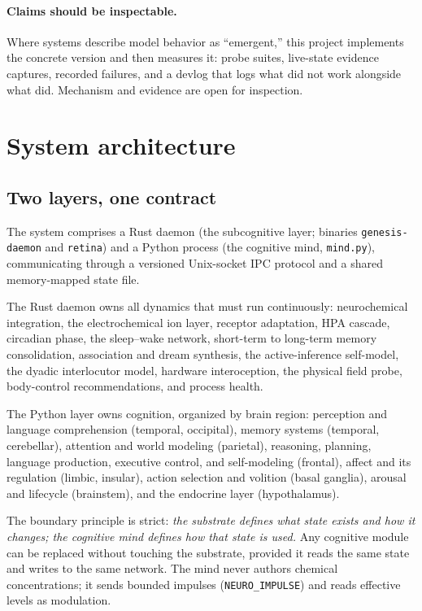 \documentclass[11pt]{article}
\newcommand{\code}[1]{\texttt{\small #1}}
\begin{document}
\paragraph{Claims should be inspectable.} Where systems describe model
behavior as ``emergent,'' this project implements the concrete version
and then measures it: probe suites, live-state evidence captures,
recorded failures, and a devlog that logs what did not work alongside
what did. Mechanism and evidence are open for inspection.

\section{System architecture}

\subsection{Two layers, one contract}

The system comprises a Rust daemon (the subcognitive layer; binaries
\code{genesis-daemon} and \code{retina}) and a Python process (the
cognitive mind, \code{mind.py}), communicating through a versioned
Unix-socket IPC protocol and a shared memory-mapped state file.

The Rust daemon owns all dynamics that must run continuously:
neurochemical integration, the electrochemical ion layer, receptor
adaptation, HPA cascade, circadian phase, the sleep--wake network,
short-term to long-term memory consolidation, association and dream
synthesis, the active-inference self-model, the dyadic interlocutor
model, hardware interoception, the physical field probe, body-control
recommendations, and process health.

The Python layer owns cognition, organized by brain region: perception
and language comprehension (temporal, occipital), memory systems
(temporal, cerebellar), attention and world modeling (parietal),
reasoning, planning, language production, executive control, and
self-modeling (frontal), affect and its regulation (limbic, insular),
action selection and volition (basal ganglia), arousal and lifecycle
(brainstem), and the endocrine layer (hypothalamus).

The boundary principle is strict: \emph{the substrate defines what
state exists and how it changes; the cognitive mind defines how that
state is used.} Any cognitive module can be replaced without touching
the substrate, provided it reads the same state and writes to the same
network. The mind never authors chemical concentrations; it sends
bounded impulses (\code{NEURO\_IMPULSE}) and reads effective levels as
modulation.
\end{document}
